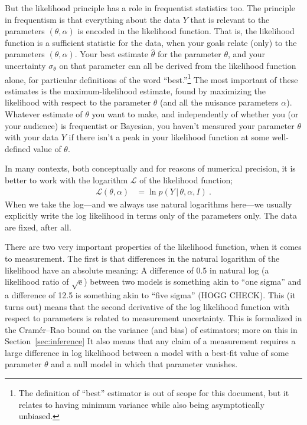 \documentclass{article}
\newcommand{\sectionname}{Section}
\newcommand{\secref}[1]{\sectionname~\ref{#1}}
\newcommand{\e}{\mathrm{e}} %
\newcommand{\given}{\,|\,}
\begin{document}
But the likelihood principle has a role in frequentist statistics too.
The principle in frequentism is that everything about the data $Y$ that is relevant to the parameters $(\theta,\alpha)$ is encoded in the likelihood function.
That is, the likelihood function is a sufficient statistic for the data, when your goals relate (only) to the parameters $(\theta,\alpha)$.
Your best estimate $\hat{\theta}$ for the parameter $\theta$, and your uncertainty $\sigma_\theta$ on that parameter can all be derived from the likelihood function alone, for particular definitions of the word ``best.''\footnote{%
The definition of ``best'' estimator is out of scope for this document, but it relates to having minimum variance while also being asymptotically unbiased.}
The most important of these estimates is the maximum-likelihood estimate, found by maximizing the likelihood with respect to the parameter $\theta$ (and all the nuisance parameters $\alpha$).
Whatever estimate of $\theta$ you want to make, and independently of whether you (or your audience) is frequentist or Bayesian, you haven't measured your parameter $\theta$ with your data $Y$ if there isn't a peak in your likelihood function at some well-defined value of $\theta$.

In many contexts, both conceptually and for reasons of numerical precision, it is better to work with the logarithm $\mathscr{L}$ of the likelihood function;
\begin{align}
    \mathscr{L}(\theta,\alpha) &= \ln p(Y\given\theta,\alpha,I) ~.
\end{align}
When we take the log---and we always use natural logarithms here---we usually explicitly write the log likelihood in terms only of the parameters only.
The data are fixed, after all.

There are two very important properties of the likelihood function, when it comes to measurement.
The first is that differences in the natural logarithm of the likelihood have an absolute meaning:
A difference of 0.5 in natural log (a likelihood ratio of $\sqrt{\e}$) between two models is something akin to ``one sigma'' and a difference of 12.5 is something akin to ``five sigma'' (HOGG CHECK).
This (it turns out) means that the second derivative of the log likelihood function with respect to parameters is related to measurement uncertainty.
This is formalized in the Cram\'er--Rao bound \cite{cramer, rao} on the variance (and bias) of estimators; more on this in \secref{sec:inference}
It also means that any claim of a measurement requires a large difference in log likelihood between a model with a best-fit value of some parameter $\theta$ and a null model in which that parameter vanishes.
\end{document}
